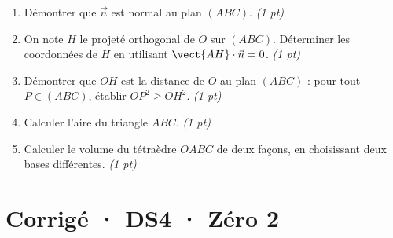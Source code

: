 \begin{enumerate}

\item Démontrer que $\vec n$ est normal au plan $(ABC)$. \hfill\textit{(1 pt)}

\item On note $H$ le projeté orthogonal de $O$ sur $(ABC)$. Déterminer les coordonnées de $H$ en utilisant $\vect{AH}\cdot\vec n=0$. \hfill\textit{(1 pt)}

\item Démontrer que $OH$ est la distance de $O$ au plan $(ABC)$ : pour tout $P\in(ABC)$, établir $OP^2\ge OH^2$. \hfill\textit{(1 pt)}

\item Calculer l'aire du triangle $ABC$. \hfill\textit{(1 pt)}

\item Calculer le volume du tétraèdre $OABC$ de deux façons, en choisissant deux bases différentes. \hfill\textit{(1 pt)}

\end{enumerate}

\ifmxteacher\mxnewpage

\section*{Corrigé · DS4 · Zéro 2}\label{cor:6-2}

